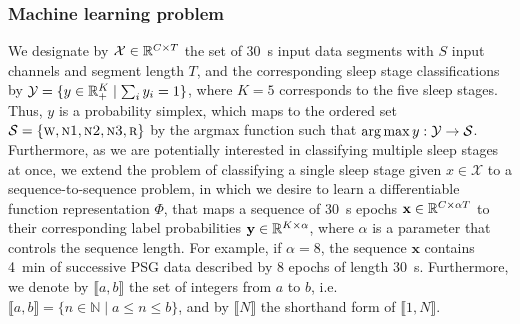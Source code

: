 \subsubsection{Machine learning problem}
We designate by $\mathcal{X} \in \mathbb{R}^{C \times T}$ the set of \SI{30}{\second} input data segments with $S$ input channels and segment length $T$, and the corresponding sleep stage classifications by $\mathcal{Y} = \lbrace y \in \mathbb{R}_{+}^{K} \mid \sum_i y_i = 1 \rbrace$, where $K = 5$ corresponds to the five sleep stages.
Thus, $y$ is a probability simplex, which maps to the ordered set $\mathcal{S} = \lbrace \textsc{w}, \textsc{n1}, \textsc{n2}, \textsc{n3}, \textsc{r} \rbrace$ by the argmax function such that $\operatorname*{arg\,max}{y : \mathcal{Y} \to \mathcal{S}}$.
Furthermore, as we are potentially interested in classifying multiple sleep stages at once, we extend the problem of classifying a single sleep stage given $x \in \mathcal{X}$ to a sequence-to-sequence problem, in which we desire to learn a differentiable function representation $\Phi$, that maps a sequence of \SI{30}{\second} epochs $\mathbf{x} \in \mathbb{R}^{C \times \alpha T}$ to their corresponding label probabilities $\mathbf{y} \in \mathbb{R}^{K \times \alpha}$, where $\alpha$ is a parameter that controls the sequence length. 
For example, if $\alpha=8$, the sequence $\mathbf{x}$ contains \SI{4}{\minute} of successive PSG data described by 8 epochs of length \SI{30}{\second}.
Furthermore, we denote by $\llbracket a, b \rrbracket$ the set of integers from $a$ to $b$, i.e. $\llbracket a, b \rrbracket = \lbrace n \in \mathbb{N} \mid a \leq n \leq b \rbrace$, and by $\llbracket N \rrbracket$ the shorthand form of $\llbracket 1, N \rrbracket$.

